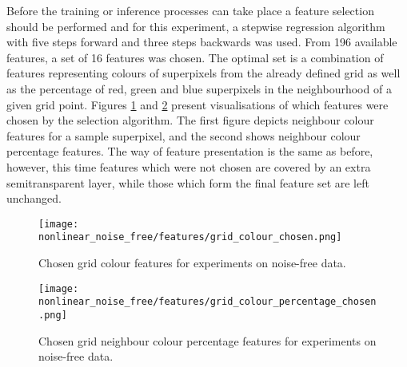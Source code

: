 Before the training or inference processes can take place a feature selection should be performed and for this experiment, a stepwise regression algorithm with five steps forward and three steps backwards was used. From 196 available features, a set of 16 features was chosen. The optimal set is a combination of features representing colours of superpixels from the already defined grid as well as the percentage of red, green and blue superpixels in the neighbourhood of a given grid point. Figures \ref{fig:nonlinear_noise_free_features_colour} and \ref{fig:nonlinear_noise_free_features_percentage} present visualisations of which features were chosen by the selection algorithm. The first figure depicts neighbour colour features for a sample superpixel, and the second shows neighbour colour percentage features. The way of feature presentation is the same as before, however, this time features which were not chosen are covered by an extra semitransparent layer, while those which form the final feature set are left unchanged.
\begin{figure}[ht]
    \centering
    \texttt{[image: nonlinear\_noise\_free/features/grid\_colour\_chosen.png]}
    \caption{Chosen grid colour features for experiments on noise-free data.}
    \label{fig:nonlinear_noise_free_features_colour}
\end{figure}
\begin{figure}[ht]
    \centering
    \texttt{[image: nonlinear\_noise\_free/features/grid\_colour\_percentage\_chosen.png]}
    \caption{Chosen grid neighbour colour percentage features for experiments on noise-free data.}
    \label{fig:nonlinear_noise_free_features_percentage}
\end{figure}


